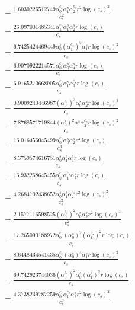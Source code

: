 \documentclass[10pt]{article}
\begin{document}
\begin{align*}
&{}  - \frac{1.6030226512749 \alpha_{0}^{c_s} \alpha_{1}^s \alpha_{2}^{c_s} r^{2} \log{\left(c_{s} \right)}^{2}}{c_{s}^{2}} \\
&{}  - \frac{26.097001485341 \alpha_{1}^{c_s} \alpha_{1}^s \alpha_{2}^s r \log{\left(c_{s} \right)}}{c_{s}} \\
&{}  - \frac{6.7425424469449 \alpha_{0}^s \left(\alpha_{1}^{c_s}\right)^{2} \alpha_{1}^s r \log{\left(c_{s} \right)}^{2}}{c_{s}} \\
&{}  - \frac{6.9070922214571 \alpha_{0}^{c_s} \alpha_{0}^s \alpha_{4}^s r \log{\left(c_{s} \right)}}{c_{s}} \\
&{}  - \frac{6.9165270668905 \alpha_{0}^{c_s} \alpha_{1}^s \alpha_{3}^{c_s} r \log{\left(c_{s} \right)}}{c_{s}} \\
&{}  - \frac{0.9009240446987 \left(\alpha_{0}^{c_s}\right)^{3} \alpha_{0}^s \alpha_{2}^s r \log{\left(c_{s} \right)}^{3}}{c_{s}} \\
&{}  - \frac{7.8768571719844 \left(\alpha_{0}^s\right)^{2} \alpha_{1}^s \alpha_{2}^{c_s} r \log{\left(c_{s} \right)}^{2}}{c_{s}} \\
&{}  - \frac{16.016456045499 \alpha_{0}^{c_s} \alpha_{0}^s \alpha_{2}^s r^{3} \log{\left(c_{s} \right)}}{c_{s}^{3}} \\
&{}  - \frac{8.3759574616751 \alpha_{0}^s \alpha_{1}^s \alpha_{3}^s r \log{\left(c_{s} \right)}}{c_{s}} \\
&{}  - \frac{16.932268645455 \alpha_{0}^{c_s} \alpha_{1}^{c_s} \alpha_{3}^s r \log{\left(c_{s} \right)}}{c_{s}} \\
&{}  - \frac{4.2684702438652 \alpha_{0}^s \alpha_{1}^s \alpha_{2}^{c_s} r^{2} \log{\left(c_{s} \right)}^{2}}{c_{s}^{2}} \\
&{}  - \frac{2.1577116598525 \left(\alpha_{0}^{c_s}\right)^{2} \alpha_{0}^s \alpha_{2}^s r^{2} \log{\left(c_{s} \right)}^{3}}{c_{s}^{2}} \\
&{}  - \frac{17.265090188972 \alpha_{0}^{c_s} \left(\alpha_{0}^s\right)^{2} \left(\alpha_{1}^{c_s}\right)^{2} r \log{\left(c_{s} \right)}}{c_{s}} \\
&{}  - \frac{8.6448434541435 \alpha_{0}^{c_s} \left(\alpha_{0}^s\right)^{4} \alpha_{1}^s r \log{\left(c_{s} \right)}^{2}}{c_{s}} \\
&{}  - \frac{69.742923744036 \left(\alpha_{0}^{c_s}\right)^{2} \alpha_{0}^s \left(\alpha_{1}^s\right)^{2} r \log{\left(c_{s} \right)}}{c_{s}} \\
&{}  - \frac{4.3738239787259 \alpha_{0}^{c_s} \alpha_{1}^{c_s} \alpha_{2}^s r^{2} \log{\left(c_{s} \right)}^{2}}{c_{s}^{2}} \\

\end{align*}
\end{document}
